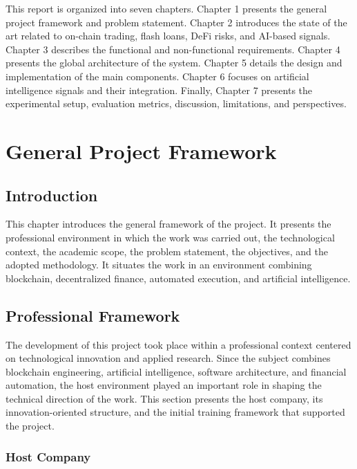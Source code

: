 \documentclass[12pt,a4paper]{report}
\begin{document}
This report is organized into seven chapters. Chapter 1 presents the general project framework and problem statement. Chapter 2 introduces the state of the art related to on-chain trading, flash loans, DeFi risks, and AI-based signals. Chapter 3 describes the functional and non-functional requirements. Chapter 4 presents the global architecture of the system. Chapter 5 details the design and implementation of the main components. Chapter 6 focuses on artificial intelligence signals and their integration. Finally, Chapter 7 presents the experimental setup, evaluation metrics, discussion, limitations, and perspectives.

\chapter{General Project Framework}
\label{chap:framework}

\section{Introduction}

This chapter introduces the general framework of the project. It presents the professional environment in which the work was carried out, the technological context, the academic scope, the problem statement, the objectives, and the adopted methodology. It situates the work in an environment combining blockchain, decentralized finance, automated execution, and artificial intelligence.

\section{Professional Framework}

The development of this project took place within a professional context centered on technological innovation and applied research. Since the subject combines blockchain engineering, artificial intelligence, software architecture, and financial automation, the host environment played an important role in shaping the technical direction of the work. This section presents the host company, its innovation-oriented structure, and the initial training framework that supported the project.

\subsection{Host Company}
\end{document}
